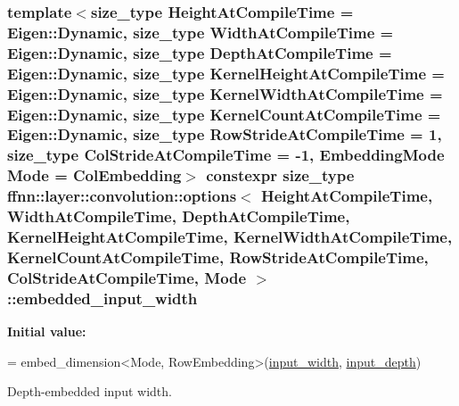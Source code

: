 \hypertarget{structffnn_1_1layer_1_1convolution_1_1options_acd86e19ee6b983f31612e91f924abefa}{
\subsubsection[{embedded\-\_\-input\-\_\-width}]{\setlength{\rightskip}{0pt plus 5cm}template$<$size\-\_\-type Height\-At\-Compile\-Time = Eigen\-::\-Dynamic, size\-\_\-type Width\-At\-Compile\-Time = Eigen\-::\-Dynamic, size\-\_\-type Depth\-At\-Compile\-Time = Eigen\-::\-Dynamic, size\-\_\-type Kernel\-Height\-At\-Compile\-Time = Eigen\-::\-Dynamic, size\-\_\-type Kernel\-Width\-At\-Compile\-Time = Eigen\-::\-Dynamic, size\-\_\-type Kernel\-Count\-At\-Compile\-Time = Eigen\-::\-Dynamic, size\-\_\-type Row\-Stride\-At\-Compile\-Time = 1, size\-\_\-type Col\-Stride\-At\-Compile\-Time = -\/1, Embedding\-Mode Mode = Col\-Embedding$>$ constexpr {\bf size\-\_\-type} {\bf ffnn\-::layer\-::convolution\-::options}$<$ Height\-At\-Compile\-Time, Width\-At\-Compile\-Time, Depth\-At\-Compile\-Time, Kernel\-Height\-At\-Compile\-Time, Kernel\-Width\-At\-Compile\-Time, Kernel\-Count\-At\-Compile\-Time, Row\-Stride\-At\-Compile\-Time, Col\-Stride\-At\-Compile\-Time, Mode $>$\-::embedded\-\_\-input\-\_\-width\hspace{0.3cm}{\ttfamily [static]}}}\label{structffnn_1_1layer_1_1convolution_1_1options_acd86e19ee6b983f31612e91f924abefa}
{\bfseries Initial value\-:}
\begin{DoxyCode}
=
    embed\_dimension<Mode, RowEmbedding>(\hyperlink{structffnn_1_1layer_1_1convolution_1_1options_a17abc9ea9d41cf399fbeae5e3f7580f4}{input\_width}, \hyperlink{structffnn_1_1layer_1_1convolution_1_1options_a5c928d8733be98927ccd22d009739deb}{input\_depth})
\end{DoxyCode}


Depth-\/embedded input width. 

